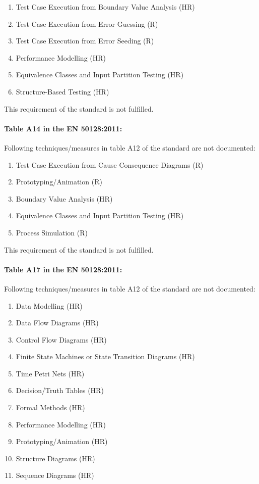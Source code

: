 \begin{enumerate}
\item	Test Case Execution from Boundary Value Analysis (HR)
\item	Test Case Execution from Error Guessing (R)
\item	Test Case Execution from Error Seeding (R)
\item	Performance Modelling (HR)
\item	Equivalence Classes and Input Partition Testing (HR)
\item	Structure-Based Testing (HR)
\end{enumerate}

This requirement of the standard is not fulfilled.

\paragraph{Table A14 in the EN 50128:2011:}
Following techniques/measures in table A12 of the standard are not documented:
\begin{enumerate}
\item	Test Case Execution from Cause Consequence Diagrams (R)
\item	Prototyping/Animation (R)
\item	Boundary Value Analysis (HR)
\item	Equivalence Classes and Input Partition Testing (HR)
\item	Process Simulation (R)
\end{enumerate}

This requirement of the standard is not fulfilled.

\paragraph{Table A17 in the EN 50128:2011:}
Following techniques/measures in table A12 of the standard are not documented:
\begin{enumerate}	
\item	Data Modelling (HR)
\item	Data Flow Diagrams (HR)
\item	Control Flow Diagrams (HR)
\item	Finite State Machines or State Transition Diagrams (HR)
\item	Time Petri Nets (HR)
\item	Decision/Truth Tables (HR)
\item	Formal Methods (HR)
\item	Performance Modelling (HR)
\item	Prototyping/Animation (HR)
\item	Structure Diagrams (HR)
\item	Sequence Diagrams (HR)
\end{enumerate}
 
